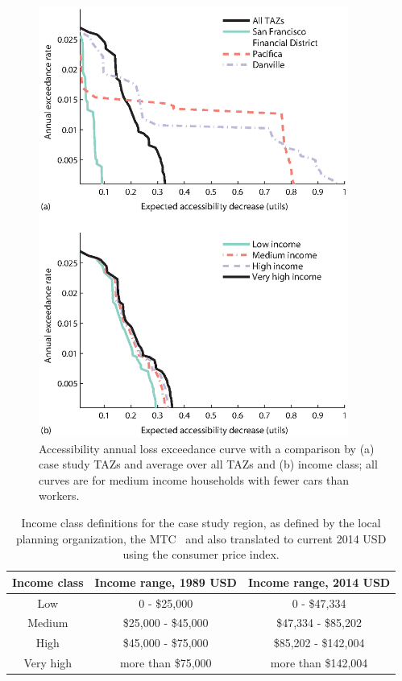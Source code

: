 \begin{figure}[!htb]
\centering
\includegraphics[width=4in]{FIGS/equity_acc_loss_curves.eps} 
\caption{Accessibility annual loss exceedance curve with a comparison by (a) case study TAZs and average over all TAZs and (b) income class; all curves are for medium income households with fewer cars than workers.}
\label{fig:acc_by_TAZ_and_income}
\end{figure}


\begin{table}
\caption{Income class definitions for the case study region, as defined by the local planning organization, the MTC~\cite{ory_personal_2013} and also translated to current 2014 USD using the consumer price index.}
\centering
\begin{tabular}{c|c|c}
\textbf{Income class}           & \textbf{Income range, 1989 USD} & \textbf{Income range, 2014 USD} \\
\hline
Low & 0 - \$25,000 & 0 - \$47,334\\
Medium &  \$25,000 - \$45,000 & \$47,334 - \$85,202\\
High & \$45,000 - \$75,000 & \$85,202 - \$142,004 \\
Very high & more than \$75,000 & more than \$142,004
\end{tabular}
\label{tab:incomes}
\end{table}


